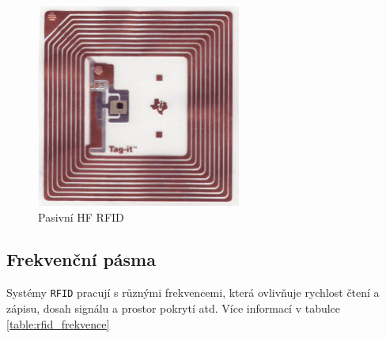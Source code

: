 \documentclass[czech,BP]{thesiskiv}
\begin{document}
\begin{figure}[ht]
   		 	\centering
			\includegraphics[width=0.6\textwidth]{../images/rfid_smart_label.jpg}	
			\caption{Pasivní HF RFID}
    		\label{fig:gpio}
		\end{figure}


\subsection{Frekvenční pásma}
Systémy \texttt{RFID} pracují s různými frekvencemi, která ovlivňuje rychlost čtení a zápisu, dosah signálu a prostor pokrytí atd.
Více informací v tabulce \ref{table:rfid_frekvence}
\end{document}
